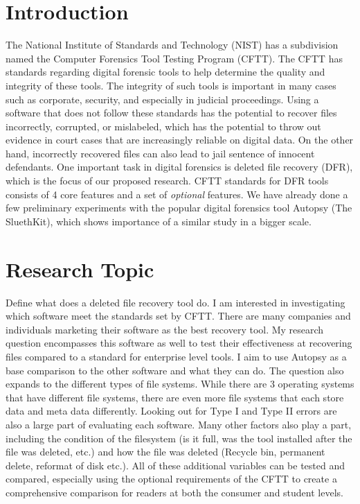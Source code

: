 \section{Introduction}
The National Institute of Standards and Technology (NIST) has a subdivision named the Computer Forensics Tool Testing Program (CFTT). 
The CFTT has standards regarding digital forensic tools to help determine the quality and integrity of these tools. The integrity 
of such tools is important in many cases such as corporate, security, and especially in judicial proceedings. 
Using a software that does not follow these standards has the potential to recover files incorrectly, corrupted, or 
mislabeled, which has the potential to throw out evidence in court cases that are increasingly reliable on digital data. 
On the other hand, incorrectly recovered files can also lead to jail sentence of innocent defendants. One important 
task in digital forensics is deleted file recovery (DFR), which is the focus of our proposed research. 
CFTT standards for DFR tools consists of 4 core features and a set of \emph{optional} features. 
We have already done a few preliminary experiments with the popular digital forensics tool Autopsy (The SluethKit), which 
shows importance of a similar study in a bigger scale.

\section{Research Topic}
Define what does a deleted file recovery tool do. I am interested in investigating which software meet the standards 
set by CFTT. There are many companies and individuals marketing their software as the best recovery tool. My 
research question encompasses this software as well to test their effectiveness at recovering files compared to a standard for enterprise 
level tools. I aim to use Autopsy as a base comparison to the other software and what they can do. The question 
also expands to the different types of file systems. While there are 3 operating systems that have different file 
systems, there are even more file systems that each store data and meta data differently. Looking out for Type I and 
Type II errors are also a large part of evaluating each software. Many other factors also play a part, including the 
condition of the filesystem (is it full, was the tool installed after the file was deleted, etc.) and how the file was 
deleted (Recycle bin, permanent delete, reformat of disk etc.). 
All of these additional variables can be tested and compared, especially using 
the optional requirements of the CFTT to create a comprehensive comparison for readers at both the consumer and student levels.
